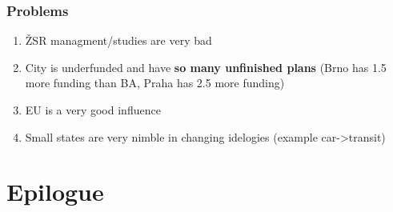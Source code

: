 \begin{frame}
	\frametitle{Problems}
	\begin{enumerate}
		\item ŽSR managment/studies are very bad
		\item City is underfunded and have \textbf{so many unfinished plans} (Brno has 1.5 more funding than BA, Praha has 2.5 more funding)
		\item EU is a very good influence
		\item Small states are very nimble in changing idelogies (example car->transit)
	\end{enumerate}
\end{frame}

\section{Epilogue}

